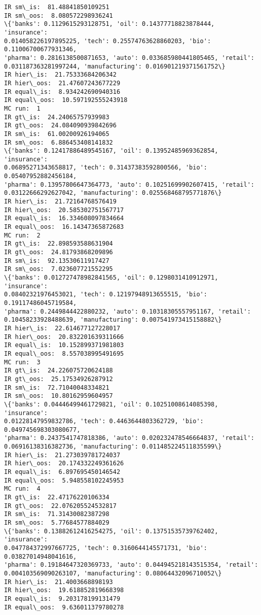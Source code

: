 \documentclass[11pt]{article}
\begin{document}
    \begin{Verbatim}[commandchars=\\\{\},fontsize=\footnotesize]
IR sm\_is:  81.48841850109251
IR sm\_oos:  8.080572298936241
\{'banks': 0.1129615293128751, 'oil': 0.14377718823878444, 'insurance':
0.014058226197895225, 'tech': 0.25574763628860203, 'bio': 0.11006700677931346,
'pharma': 0.2816138500871653, 'auto': 0.033685980441805465, 'retail':
0.031187363281997244, 'manufacturing': 0.016901219371561752\}
IR hier\_is:  21.75333684206342
IR hier\_oos:  21.47607243677229
IR equal\_is:  8.934242690940316
IR equal\_oos:  10.597192555243918
MC run:  1
IR gt\_is:  24.24065757939983
IR gt\_oos:  24.084090939842696
IR sm\_is:  61.00200926194065
IR sm\_oos:  6.886453408141832
\{'banks': 0.12417886489545167, 'oil': 0.13952485969362854, 'insurance':
0.06895271343658817, 'tech': 0.31437383592800566, 'bio': 0.05407952882456184,
'pharma': 0.13957806647364773, 'auto': 0.10251699902607415, 'retail':
0.03122666292627042, 'manufacturing': 0.025568468795771876\}
IR hier\_is:  21.72164768576419
IR hier\_oos:  20.585302751567717
IR equal\_is:  16.334608097834664
IR equal\_oos:  16.14347365872683
MC run:  2
IR gt\_is:  22.898593588631904
IR gt\_oos:  24.81793868209896
IR sm\_is:  92.13530611917427
IR sm\_oos:  7.023607721552295
\{'banks': 0.012727478982841565, 'oil': 0.1298031410912971, 'insurance':
0.08402321976453021, 'tech': 0.12197948913655515, 'bio': 0.19117486045719584,
'pharma': 0.2449844422880232, 'auto': 0.10318305557951167, 'retail':
0.10458233928488639, 'manufacturing': 0.007541973415158882\}
IR hier\_is:  22.614677127228017
IR hier\_oos:  20.832201639311666
IR equal\_is:  10.152899371981803
IR equal\_oos:  8.557038995491695
MC run:  3
IR gt\_is:  24.226075720624188
IR gt\_oos:  25.17534926287912
IR sm\_is:  72.71040048334821
IR sm\_oos:  10.80162959604957
\{'banks': 0.04446499461729821, 'oil': 0.10251008614085398, 'insurance':
0.01228147959832786, 'tech': 0.4463644803362729, 'bio': 0.049745698303080677,
'pharma': 0.2437541747818386, 'auto': 0.020232478546664837, 'retail':
0.06916138316382736, 'manufacturing': 0.011485224511835599\}
IR hier\_is:  21.273039781724037
IR hier\_oos:  20.174332249361626
IR equal\_is:  6.897695450146542
IR equal\_oos:  5.948558102245953
MC run:  4
IR gt\_is:  22.47176220106334
IR gt\_oos:  22.076205524532817
IR sm\_is:  71.31430082387298
IR sm\_oos:  5.77684577884029
\{'banks': 0.13882612416254275, 'oil': 0.13751535739762402, 'insurance':
0.047784372997667725, 'tech': 0.3160644145571731, 'bio': 0.03827014948041616,
'pharma': 0.19184647320369733, 'auto': 0.044945218143515354, 'retail':
0.004103569090263107, 'manufacturing': 0.08064432096710052\}
IR hier\_is:  21.4003668898193
IR hier\_oos:  19.618852819668398
IR equal\_is:  9.203178199131479
IR equal\_oos:  9.636011379780278

    \end{Verbatim}
\end{document}
